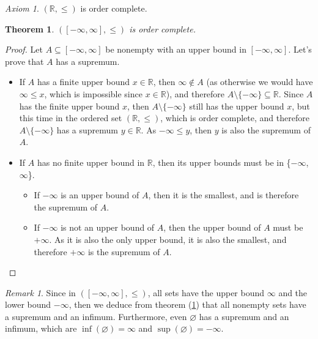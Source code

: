 \documentclass{article}
\newtheorem{theorem}{Theorem}[section]
\theoremstyle{definition}
\theoremstyle{remark}
\newtheorem*{remark}{Remark}
\theoremstyle{example}
\theoremstyle{notation}
\theoremstyle{axiom}
\newtheorem{axiom}{Axiom}[section]
\begin{document}
\begin{axiom}
		$(\mathbb{R}, \leq)$ is order complete.
\end{axiom}

\begin{theorem} \label{thm:r-bar-order-complete}
		$([-\infty, \infty], \leq)$ is order complete.
\end{theorem}

\begin{proof}
		Let $A \subseteq [-\infty, \infty]$ be nonempty with an upper bound in $[-\infty, \infty]$. Let's prove that $A$ has a supremum.
		\begin{itemize}
				\item If $A$ has a finite upper bound $x \in \mathbb{R}$, then $\infty \notin A$ (as otherwise we would have $\infty \leq x$, which is impossible since $x \in \mathbb{R}$), and therefore $A \setminus \{-\infty\} \subseteq \mathbb{R}$. Since $A$ has the finite upper bound $x$, then $A \setminus \{-\infty\}$ still has the upper bound $x$, but this time in the ordered set $(\mathbb{R}, \leq)$, which is order complete, and therefore $A \setminus \{-\infty\}$ has a supremum $y \in \mathbb{R}$. As $-\infty \leq y$, then $y$ is also the supremum of $A$.
				\item If $A$ has no finite upper bound in $\mathbb{R}$, then its upper bounds must be in \{$-\infty$, $\infty$\}.
				\begin{itemize}
						\item If $-\infty$ is an upper bound of $A$, then it is the smallest, and is therefore the supremum of $A$.
						\item If $-\infty$ is not an upper bound of $A$, then the upper bound of $A$ must be $+\infty$. As it is also the only upper bound, it is also the smallest, and therefore $+\infty$ is the supremum of $A$.
				\end{itemize}
		\end{itemize}
\end{proof}

\begin{remark}
		Since in $([-\infty, \infty], \leq)$, all sets have the upper bound $\infty$ and the lower bound $-\infty$, then we deduce from theorem (\ref{thm:r-bar-order-complete}) that all nonempty sets have a supremum and an infimum. Furthermore, even $\varnothing$ has a supremum and an infimum, which are $\inf(\varnothing) = \infty$ and $\sup(\varnothing) = -\infty$.
\end{remark}
\end{document}

